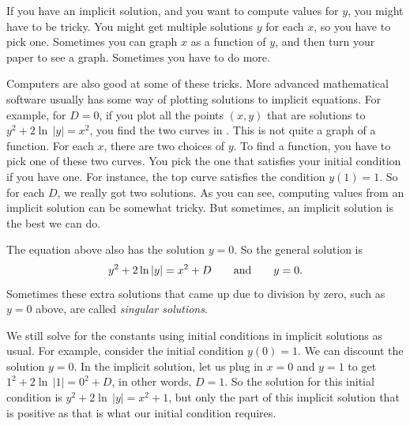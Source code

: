 If you have an implicit solution, and
you want to compute values
for $y$, you might have to be tricky.  You might get multiple solutions $y$
for each $x$, so you have to pick one.  Sometimes you can
graph $x$ as a function of $y$, and then turn your paper to
see a graph.
Sometimes you have to do more.

Computers are also good at some of these tricks.
More advanced mathematical software usually has some
way of plotting solutions to implicit equations.
For example, for $D=0$, if you plot all the points $(x,y)$ that
are solutions to $y^2+2\ln \, \lvert y\rvert=x^2$,
you find the two curves in .  This is not quite
a graph of a function. For each $x$, there are two choices of $y$.
To find a function, you have to pick one of these two curves.
You pick the one that satisfies your initial condition if you have one.
For instance, the top curve satisfies the condition $y(1)=1$.
So for each $D$, we really got two solutions.
As you can see, computing values from an implicit solution can be somewhat
tricky.  But sometimes, an implicit solution is the best we can do.

\begin{myfig}
\capstart
{}
\caption{The implicit solution $y^2+2\ln \, \lvert y\rvert = x^2$
to $y'=\frac{xy}{y^2+1}$.\label{implicitsols:fig}}
\end{myfig}

The equation above also has the solution $y=0$.
So the general solution is
\begin{equation*}
y^2 + 2 \ln \, \lvert y \rvert = x^2 + D \qquad \text{and} \qquad y=0.
\avoidbreak
\end{equation*}
Sometimes these extra solutions that came up
due to division by zero, such as
$y=0$ above,
are called \emph{singular solutions}.

We still solve for the constants using initial conditions in implicit
solutions as usual.  For example, consider the initial condition
$y(0)=1$.  We can discount the solution $y=0$.  In the implicit solution,
let us plug in $x=0$ and $y=1$ to get $1^2 + 2 \ln \, \lvert 1 \rvert = 0^2 +
D$, in other words, $D=1$.  So the solution for this initial condition
is $y^2 + 2 \ln \, \lvert y \rvert = x^2 + 1$, but only the part of this
implicit solution that is positive as that is what our initial condition requires.

